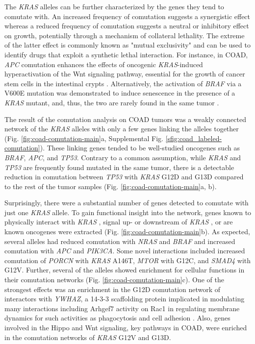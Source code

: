 \documentclass[english, 12pt, letterpaper]{article}
\newcommand{\KRAS}{\emph{KRAS}}
\begin{document}
The \KRAS{} alleles can be further characterized by the genes they tend to comutate with.
An increased frequency of comutation suggests a synergistic effect whereas a reduced frequency of comutation suggests a neutral or inhibitory effect on growth, potentially through a mechanism of collateral lethality.
The extreme of the latter effect is commonly known as "mutual exclusivity" and can be used to identify drugs that exploit a synthetic lethal interaction.
For instance, in COAD, \emph{APC} comutation enhances the effects of oncogenic \KRAS{}-induced hyperactivation of the Wnt signaling pathway, essential for the growth of cancer stem cells in the intestinal crypts \cite{Janssen2006, Fearon2014, Sakai2018, Jauhri2017}.
Alternatively, the activation of \emph{BRAF} via a V600E mutation was demonstrated to induce senescence in the presence of a \KRAS{} mutant, and, thus, the two are rarely found in the same tumor \cite{Seth2009ConcomitantCancer., Cisowski2016, Jauhri2017}.

The result of the comutation analysis on COAD tumors was a weakly connected network of the \KRAS{} alleles with only a few genes linking the alleles together (Fig. \ref{fig:coad-comutation-main}a, Supplemental Fig. \ref{sfig:coad_labeled-comutation}).
These linking genes tended to be well-studied oncogenes such as \emph{BRAF}, \emph{APC}, and \emph{TP53}.
Contrary to a common assumption, while \KRAS{} and \emph{TP53} are frequently found mutated in the same tumor, there is a detectable reduction in comutation between \emph{TP53} with \KRAS{} G12D and G13D compared to the rest of the tumor samples (Fig. \ref{fig:coad-comutation-main}a, b).

Surprisingly, there were a substantial number of genes detected to comutate with just one \KRAS{} allele.
To gain functional insight into the network, genes known to physically interact with \KRAS{} \cite{Kovalski2019}, signal up- or downstream of \KRAS{} \cite{Kanehisa2017, Kanehisa2016KEGGAnnotation.}, or are known oncogenes \cite{Bamford2004TheWebsite., Sondka2018} were extracted (Fig. \ref{fig:coad-comutation-main}b).
As expected, several alleles had reduced comutation with \emph{NRAS} and \emph{BRAF} and increased comutation with \emph{APC} and \emph{PIK3CA}. Some novel interactions included increased comutation of \emph{PORCN} with \KRAS{} A146T, \emph{MTOR} with G12C, and \emph{SMAD4} with G12V.
Further, several of the alleles showed enrichment for cellular functions in their comutation networks (Fig. \ref{fig:coad-comutation-main}c).
One of the strongest effects was an enrichment in the G12D comutation network of interactors with \emph{YWHAZ}, a 14-3-3 scaffolding protein implicated in modulating many interactions including Arhgef7 activity on Rac1 in regulating membrane dynamics for such activities as phagocytosis and cell adhesion \cite{Angrand2006TransgenicSignaling.}.
Also, genes involved in the Hippo and Wnt signaling, key pathways in COAD, were enriched in the comutation networks of \KRAS{} G12V and G13D.
\end{document}
